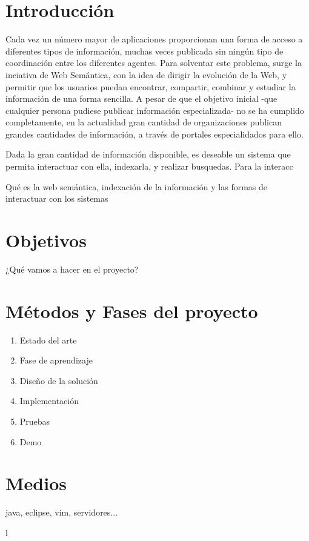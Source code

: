 \documentclass[a4paper,11pt]{report}
\begin{document}
\chapter*{Introducción}

Cada vez un número mayor de aplicaciones proporcionan una forma de acceso a diferentes tipos de información, muchas veces publicada sin ningún tipo de coordinación entre los diferentes agentes. Para solventar este problema, surge la inciativa de Web Semántica, con la idea de dirigir la evolución de la Web, y permitir que los usuarios puedan encontrar, compartir, combinar y estudiar la información de una forma sencilla. A pesar de que el objetivo inicial -que cualquier persona pudiese publicar información especializada- no se ha cumplido completamente, en la actualidad gran cantidad de organizaciones publican grandes cantidades de información, a través de portales especialidados para ello.

Dada la gran cantidad de información disponible, es deseable un sistema que permita interactuar con ella, indexarla, y realizar busquedas. Para la interacc



Qué es la web semántica, indexación de la información y las formas de interactuar con los sistemas

\chapter*{Objetivos}
¿Qué vamos a hacer en el proyecto?

\chapter*{Métodos y Fases del proyecto}
\begin{enumerate}
  \item Estado del arte
  \item Fase de aprendizaje
  \item Diseño de la solución
  \item Implementación
  \item Pruebas
  \item Demo
\end{enumerate}

\chapter*{Medios}

java, eclipse, vim, servidores...

\nocite{*}
l 
{
\small

}
\end{document}
